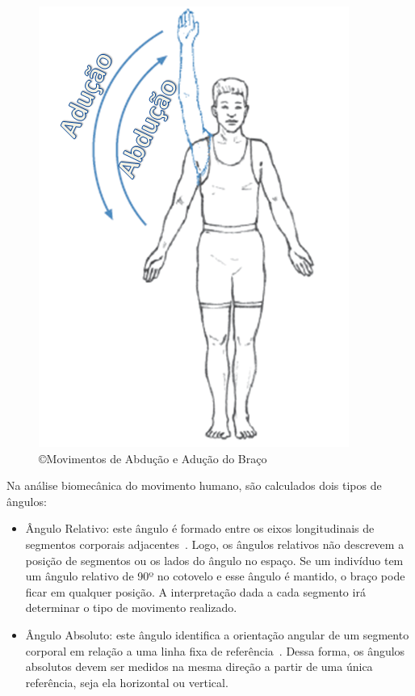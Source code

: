 \begin{figure}
 \centering
 \includegraphics[scale=0.5]{./img/abducao.png}
\caption[Movimentos de abdução e adução do braço]{\copyright Movimentos de Abdução e Adução do Braço~\cite{mcginnis2013biomechanics}}
 \label{fig:movabducaoaducao}
\end{figure}

Na análise biomecânica do movimento humano, são calculados dois tipos de ângulos:
	\begin{itemize}
		\item Ângulo Relativo: este ângulo é formado entre os eixos longitudinais de segmentos corporais adjacentes~\cite{hamill1999bases}. Logo, os ângulos relativos não descrevem a posição de segmentos ou os lados do ângulo no espaço. Se um indivíduo tem um ângulo relativo de 90º no cotovelo e esse ângulo é mantido, o braço pode ficar em qualquer posição. A interpretação dada a cada segmento irá determinar o tipo de movimento realizado. 
		\item Ângulo Absoluto: este ângulo identifica a orientação angular de um segmento corporal em relação a uma linha fixa de referência~\cite{hamill1999bases}. Dessa forma, os ângulos absolutos devem ser medidos na mesma direção a partir de uma única referência, seja ela horizontal ou vertical.
	\end{itemize}

